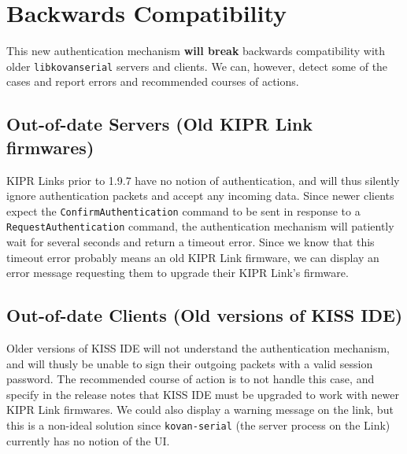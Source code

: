 \documentclass{article}
\newcommand{\lks}[0]{\texttt{libkovanserial} }
\begin{document}
	\section{Backwards Compatibility}
	
	This new authentication mechanism \textbf{will break} backwards compatibility with older \lks servers and clients. We can,
	however, detect some of the cases and report errors and recommended courses of actions.
	
	\subsection{Out-of-date Servers (Old KIPR Link firmwares)}
	KIPR Links prior to 1.9.7 have no notion of authentication, and will thus silently ignore authentication packets and accept
	any incoming data. Since newer clients expect the \texttt{ConfirmAuthentication} command to be sent in response to a
	\texttt{RequestAuthentication} command, the authentication mechanism will patiently wait for several seconds and return
	a timeout error. Since we know that this timeout error probably means an old KIPR Link firmware, we can display an error
	message requesting them to upgrade their KIPR Link's firmware.
	
	\subsection{Out-of-date Clients (Old versions of KISS IDE)}
	Older versions of KISS IDE will not understand the authentication mechanism, and will thusly be unable to sign their
	outgoing packets with a valid session password. The recommended course of action is to not handle this case, and specify
	in the release notes that KISS IDE must be upgraded to work with newer KIPR Link firmwares. We could also display a warning
	message on the link, but this is a non-ideal solution since \texttt{kovan-serial} (the server process on the Link) currently
	has no notion of the UI.
	
	
\end{document}
